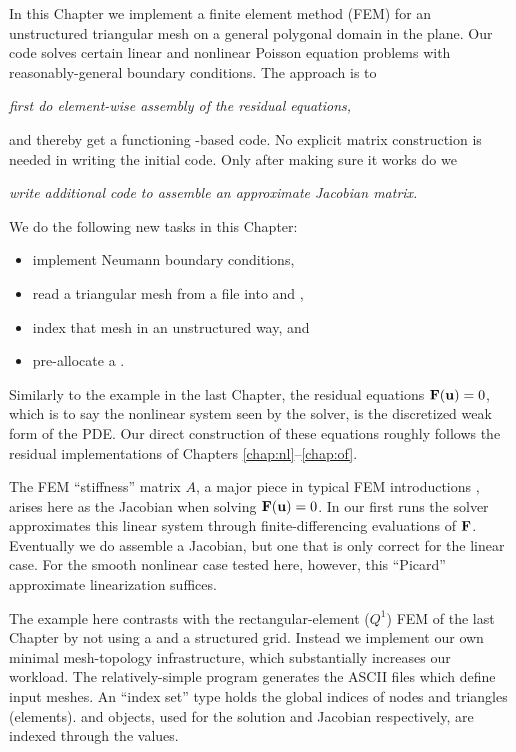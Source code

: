 
In this Chapter we implement a finite element method (FEM) for an unstructured triangular mesh on a general polygonal domain in the plane.  Our code solves certain linear and nonlinear Poisson equation problems with reasonably-general boundary conditions.  The approach is to
\begin{center}
\emph{first do element-wise assembly of the residual equations,}
\end{center}
and thereby get a functioning \pSNES-based code.  No explicit matrix construction is needed in writing the initial code.  Only after making sure it works do we
\begin{center}
\emph{write additional code to assemble an approximate Jacobian matrix.}
\end{center}

We do the following new tasks in this Chapter:
\begin{itemize}
\item implement Neumann boundary conditions,
\item read a triangular mesh from a file into \PETSc \pVecs and \pISs,
\item index that mesh in an unstructured way, and
\item pre-allocate a \PETSc \pMat.
\end{itemize}

Similarly to the example in the last Chapter, the residual equations $\mathbf{F}(\mathbf{u})=0$, which is to say the nonlinear system seen by the \pSNES solver, is the discretized weak form of the PDE.  Our direct construction of these equations roughly follows the residual implementations of Chapters \ref{chap:nl}--\ref{chap:of}.

The FEM ``stiffness'' matrix $A$, a major piece in typical FEM introductions \citep{Braess2007,Elmanetal2005}, arises here as the Jacobian when solving $\mathbf{F}(\mathbf{u})=0$.  In our first runs the \pSNES solver approximates this linear system through finite-differencing evaluations of $\mathbf{F}$.  Eventually we do assemble a Jacobian, but one that is only correct for the linear case.  For the smooth nonlinear case tested here, however, this ``Picard'' approximate linearization suffices.

The example here contrasts with the rectangular-element ($Q^1$) FEM of the last Chapter by not using a \pDMDA and a structured grid.  Instead we implement our own minimal mesh-topology infrastructure, which substantially increases our workload.  The relatively-simple \Triangle program generates the ASCII files which define input meshes.  An ``index set'' \pIS  type holds the global indices of nodes and triangles (elements).  \pVec and \pMat objects, used for the solution and Jacobian respectively, are indexed through the \pIS values.

